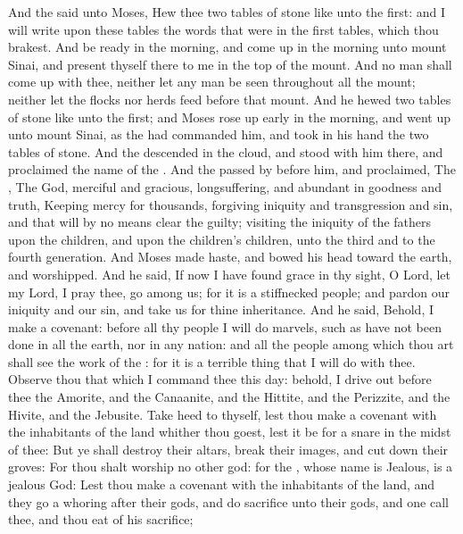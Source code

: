 \begin{biblechapter} %
 And the \LORD said unto Moses, Hew thee two tables of stone like unto the first: and I will write upon these tables the words that were in the first tables, which thou brakest.
\verse And be ready in the morning, and come up in the morning unto mount Sinai, and present thyself there to me in the top of the mount.
\verse And no man shall come up with thee, neither let any man be seen throughout all the mount; neither let the flocks nor herds feed before that mount.
\verse And he hewed two tables of stone like unto the first; and Moses rose up early in the morning, and went up unto mount Sinai, as the \LORD had commanded him, and took in his hand the two tables of stone.
\verse And the \LORD descended in the cloud, and stood with him there, and proclaimed the name of the \LORD.
\verse And the \LORD passed by before him, and proclaimed, The \LORD, The \LORD God, merciful and gracious, longsuffering, and abundant in goodness and truth,
\verse Keeping mercy for thousands, forgiving iniquity and transgression and sin, and that will by no means clear the guilty; visiting the iniquity of the fathers upon the children, and upon the children's children, unto the third and to the fourth generation.
\verse And Moses made haste, and bowed his head toward the earth, and worshipped.
\verse And he said, If now I have found grace in thy sight, O Lord, let my Lord, I pray thee, go among us; for it is a stiffnecked people; and pardon our iniquity and our sin, and take us for thine inheritance.
\verse And he said, Behold, I make a covenant: before all thy people I will do marvels, such as have not been done in all the earth, nor in any nation: and all the people among which thou art shall see the work of the \LORD: for it is a terrible thing that I will do with thee.
\verse Observe thou that which I command thee this day: behold, I drive out before thee the Amorite, and the Canaanite, and the Hittite, and the Perizzite, and the Hivite, and the Jebusite.
\verse Take heed to thyself, lest thou make a covenant with the inhabitants of the land whither thou goest, lest it be for a snare in the midst of thee:
\verse But ye shall destroy their altars, break their images, and cut down their groves:
\verse For thou shalt worship no other god: for the \LORD, whose name is Jealous, is a jealous God:
\verse Lest thou make a covenant with the inhabitants of the land, and they go a whoring after their gods, and do sacrifice unto their gods, and one call thee, and thou eat of his sacrifice;

\end{biblechapter}
